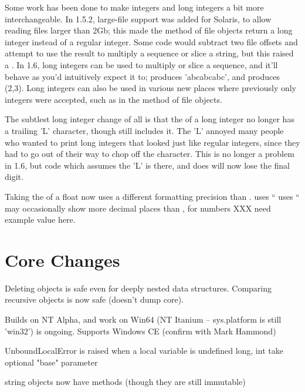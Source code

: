 \documentclass{howto}
\begin{document}
Some work has been done to make integers and long integers a bit more
interchangeable.  In 1.5.2, large-file support was added for Solaris,
to allow reading files larger than 2Gb; this made the 
method of file objects return a long integer instead of a regular
integer.  Some code would subtract two file offsets and attempt to use
the result to multiply a sequence or slice a string, but this raised a
.   In 1.6, long integers can be used to multiply
or slice a sequence, and it'll behave as you'd intuitively expect it to; 
 produces 'abcabcabc', and 
 produces (2,3). Long integers can also be
used in various new places where previously only integers were
accepted, such as in the  method of file objects.

The subtlest long integer change of all is that the 
of a long integer no longer has a trailing 'L' character, though
 still includes it.  The 'L' annoyed many people who
wanted to print long integers that looked just like regular integers,
since they had to go out of their way to chop off the character.  This
is no longer a problem in 1.6, but code which assumes the 'L' is
there, and does  will now lose the final
digit.  

Taking the  of a float now uses a different
formatting precision than .   uses
``%
 uses ``%
 may occasionally show more decimal places than 
, for numbers 
XXX need example value here.


\section{Core Changes}

Deleting objects is safe even for deeply nested data structures.
Comparing recursive objects is now safe (doesn't dump core).

Builds on NT Alpha, and work on Win64 (NT Itanium -- sys.platform is
still 'win32') is ongoing.  Supports Windows CE (confirm with Mark
Hammond)

UnboundLocalError is raised when a local variable is undefined
long, int take optional "base" parameter

string objects now have methods (though they are still immutable)
\end{document}
